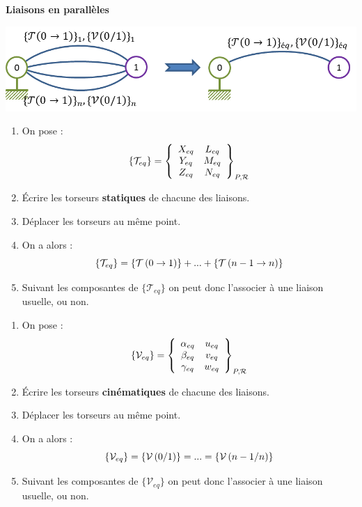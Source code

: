 \documentclass[10pt]{article}
\begin{document}
\begin{methode}
\textbf{Liaisons en parallèles}

\begin{center}
\includegraphics[width=.5\textwidth]{images/parallele}
\end{center}

\begin{minipage}[t]{.47\linewidth}
\noindent\colorbox{rougef}{\makebox[\textwidth][l]{%
\textbf{\textsf{\textcolor{white}{Méthode statique}}}
}}
\begin{enumerate}
\item On pose : 
$$
\{\mathcal{T}_{eq}\}=\torseurcol{X_{eq}}{Y_{eq}}{Z_{eq}}{L_{eq}}{M_{eq}}{N_{eq}}{P,\mathcal{R}}
$$
\item Écrire les torseurs \textbf{statiques} de chacune des liaisons.
\item Déplacer les torseurs au même point.
\item On a alors : $$
\{\mathcal{T}_{eq}\}=\torseurstat{T}{0}{1}
+...
+\torseurstat{T}{n-1}{n}
$$
\item Suivant les composantes de $\{\mathcal{T}_{eq}\}$ on peut donc l'associer à une liaison usuelle, ou non.
\end{enumerate}
\end{minipage}\hfill
\begin{minipage}[t]{.47\linewidth}
\noindent\colorbox{rougef}{\makebox[\textwidth][l]{%
\textbf{\textsf{\textcolor{white}{Méthode cinématique}}}
}}
\begin{enumerate}
\item On pose : 
$$
\{\mathcal{V}_{eq}\}=\torseurcol{\alpha_{eq}}{\beta_{eq}}{\gamma_{eq}}{u_{eq}}{v_{eq}}{w_{eq}}{P,\mathcal{R}}
$$
\item Écrire les torseurs \textbf{cinématiques} de chacune des liaisons.
\item Déplacer les torseurs au même point.
\item On a alors : 
$$
\{\mathcal{V}_{eq} \}=\torseurcin{V}{0}{1}=...
=\torseurcin{V}{n-1}{n}
$$
\item Suivant les composantes de $\{\mathcal{V}_{eq}\}$ on peut donc l'associer à une liaison usuelle, ou non.
\end{enumerate}
\end{minipage}
\end{methode}
\end{document}
